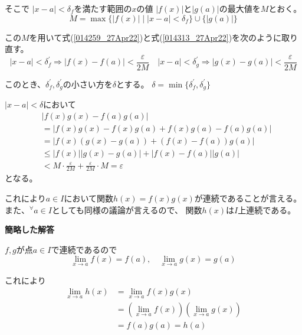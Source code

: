 \documentclass[12pt,b5paper]{ltjsarticle}
\begin{document}
そこで
$\lvert x-a \rvert  < \delta_f$を満たす範囲の$x$の値
$\lvert f(x)\rvert$と$\lvert g(a)\rvert$の最大値を$M$とおく。
\begin{equation}
 M = \max\{ \lvert f(x)\rvert \mid \lvert x-a \rvert  < \delta_f \}
  \cup \{ \lvert g(a)\rvert \}
\end{equation}

この$M$を用いて式(\ref{014259_27Apr22})と式(\ref{014313_27Apr22})を次のように取り直す。
\begin{equation}
 \lvert x-a \rvert  < \delta_f^\prime \Rightarrow \lvert f(x)-f(a) \rvert < \frac{\varepsilon}{2M}
\quad
\lvert x-a \rvert  < \delta_g^\prime \Rightarrow \lvert g(x)-g(a) \rvert < \frac{\varepsilon}{2M}
\end{equation}

このとき、$\delta_f^\prime, \delta_g^\prime$の小さい方を$\delta$とする。
 $\delta = \min\{ \delta_f^\prime, \delta_g^\prime\}$

$\lvert x-a \rvert  < \delta$において
\begin{align}
 & \lvert f(x)g(x) - f(a)g(a) \rvert\\
  &= \lvert f(x)g(x) - f(x)g(a) + f(x)g(a) - f(a)g(a) \rvert\\
  &= \lvert f(x)(g(x) - g(a)) + (f(x) - f(a))g(a) \rvert\\
  & \leq \lvert f(x)\rvert \lvert g(x) - g(a)\rvert + \lvert f(x) - f(a)\rvert \lvert g(a) \rvert\\
 &< M \cdot \frac{\varepsilon}{2M} + \frac{\varepsilon}{2M} \cdot M
 = \varepsilon
\end{align}
となる。

これにより$a\in I$において関数$h(x)=f(x)g(x)$が連続であることが言える。
また、${}^\forall a \in I$としても同様の議論が言えるので、
関数$h(x)$は$I$上連続である。

\dotfill

\textbf{簡略した解答}

$f,g$が点$a\in I$で連続であるので
\begin{equation}
 \lim_{x\rightarrow a} f(x) =f(a),
  \quad
  \lim_{x\rightarrow a} g(x) =g(a)
\end{equation}

これにより
\begin{align}
 \lim_{x\rightarrow a} h(x)
 &= \lim_{x\rightarrow a} f(x)g(x)\\
 &= \left(\lim_{x\rightarrow a} f(x) \right) \left(\lim_{x\rightarrow a} g(x) \right)\\
 &= f(a)g(a) = h(a)
\end{align}
\end{document}
